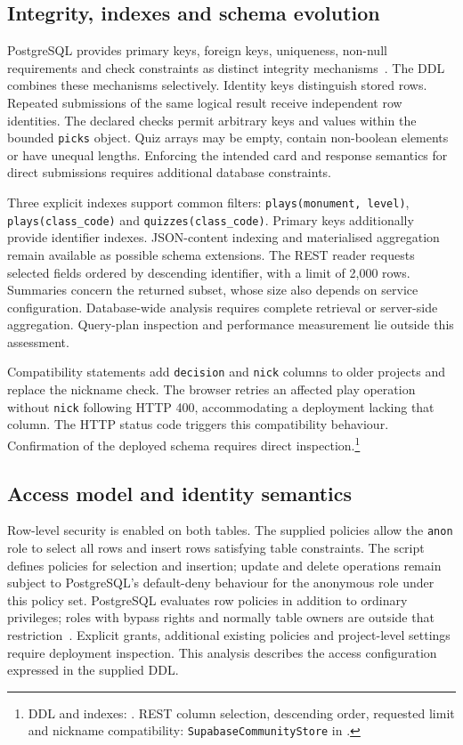 \documentclass[10pt,a4paper]{article}
\begin{document}
\subsection{Integrity, indexes and schema evolution}
PostgreSQL provides primary keys, foreign keys, uniqueness, non-null requirements and check constraints as distinct integrity mechanisms~\cite{pgconstraints}. The DDL combines these mechanisms selectively. Identity keys distinguish stored rows. Repeated submissions of the same logical result receive independent row identities. The declared checks permit arbitrary keys and values within the bounded \texttt{picks} object. Quiz arrays may be empty, contain non-boolean elements or have unequal lengths. Enforcing the intended card and response semantics for direct submissions requires additional database constraints.

Three explicit indexes support common filters: \texttt{plays(monument, level)}, \texttt{plays(class\_code)} and \texttt{quizzes(class\_code)}. Primary keys additionally provide identifier indexes. JSON-content indexing and materialised aggregation remain available as possible schema extensions. The REST reader requests selected fields ordered by descending identifier, with a limit of 2,000 rows. Summaries concern the returned subset, whose size also depends on service configuration. Database-wide analysis requires complete retrieval or server-side aggregation. Query-plan inspection and performance measurement lie outside this assessment.

Compatibility statements add \texttt{decision} and \texttt{nick} columns to older projects and replace the nickname check. The browser retries an affected play operation without \texttt{nick} following HTTP 400, accommodating a deployment lacking that column. The HTTP status code triggers this compatibility behaviour. Confirmation of the deployed schema requires direct inspection.\footnote{DDL and indexes: . REST column selection, descending order, requested limit and nickname compatibility: \texttt{SupabaseCommunityStore} in .}

\subsection{Access model and identity semantics}
Row-level security is enabled on both tables. The supplied policies allow the \texttt{anon} role to select all rows and insert rows satisfying table constraints. The script defines policies for selection and insertion; update and delete operations remain subject to PostgreSQL's default-deny behaviour for the anonymous role under this policy set. PostgreSQL evaluates row policies in addition to ordinary privileges; roles with bypass rights and normally table owners are outside that restriction~\cite{pgrls}. Explicit grants, additional existing policies and project-level settings require deployment inspection. This analysis describes the access configuration expressed in the supplied DDL.
\end{document}
